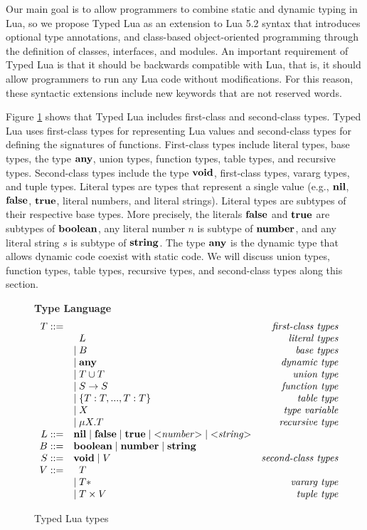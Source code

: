 Our main goal is to allow programmers to combine static and dynamic
typing in Lua, so we propose Typed Lua as an extension to Lua 5.2
syntax that introduces optional type annotations, and class-based
object-oriented programming through the definition of classes,
interfaces, and modules.
An important requirement of Typed Lua is that it should be backwards
compatible with Lua, that is, it should allow programmers to run any
Lua code without modifications.
For this reason, these syntactic extensions include new keywords
that are not reserved words.

Figure \ref{fig:typelang} shows that Typed Lua includes first-class
and second-class types.
Typed Lua uses first-class types for representing Lua values and
second-class types for defining the signatures of functions.
First-class types include literal types, base types, the type $\mathbf{any}$,
union types, function types, table types, and recursive types.
Second-class types include the type $\mathbf{void}$, first-class types,
vararg types, and tuple types.
Literal types are types that represent a single value
(e.g., $\mathbf{nil}$, $\mathbf{false}$, $\mathbf{true}$, literal numbers, and
literal strings).
Literal types are subtypes of their respective base types.
More precisely, the literals $\mathbf{false}$ and $\mathbf{true}$ are subtypes of
$\mathbf{boolean}$, any literal number $n$ is subtype of $\mathbf{number}$, and any
literal string $s$ is subtype of $\mathbf{string}$.
The type $\mathbf{any}$ is the dynamic type that allows dynamic code coexist
with static code.
We will discuss union types, function types, table types, recursive
types, and second-class types along this section.

\begin{figure}[!ht]
\textbf{Type Language}\\
\dstart
$$
\begin{array}{rlr}
T ::= & & \emph{first-class types}\\
& \;\; L & \emph{literal types}\\
& | \; B & \emph{base types}\\
& | \; \mathbf{any} & \emph{dynamic type}\\
& | \; T \cup T & \emph{union type}\\
& | \; S \rightarrow S & \emph{function type}\\
& | \; \{T:T, ..., T:T\} & \emph{table type}\\
& | \; X & \emph{type variable}\\
& | \; \mu X.T & \emph{recursive type}\\
L ::= & \mathbf{nil} \; | \; \mathbf{false} \; | \; \mathbf{true} \; | \;
  {<}{\it number}{>} \; | \; {<}{\it string}{>} & \\
B ::= & \mathbf{boolean} \; | \; \mathbf{number} \; | \; \mathbf{string} & \\
S ::= & \mathbf{void} \; | \; V & \emph{second-class types}\\
V ::= & \;\; T & \\
& | \; T* & \emph{vararg type}\\
& | \; T \times V & \emph{tuple type}
\end{array}
$$
\dend
\caption{Typed Lua types}
\label{fig:typelang}
\end{figure}

